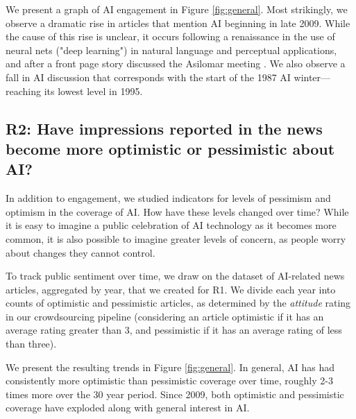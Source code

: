 \documentclass[letterpaper]{article}
\begin{document}
We present a graph of AI engagement in Figure \ref{fig:general}. Most strikingly, we observe a dramatic rise in articles that mention AI beginning in late 2009.  While the cause of this rise is unclear, it occurs following a renaissance in the use of neural nets ("deep learning") in natural language and perceptual applications, and after a front page story discussed the Asilomar meeting \cite{asilomar}. We also observe a fall in AI discussion that corresponds with the start of the 1987 AI winter---reaching its lowest level in 1995. %

\subsection{R2: Have impressions reported in the news become more optimistic or pessimistic about AI?}

In addition to engagement, we studied indicators for levels of pessimism and optimism in the coverage of AI. How have these levels changed over time? While it is easy to imagine a public celebration of AI technology as it becomes more common, it is also possible to imagine greater levels of concern, as people worry about changes they cannot control.

To track public sentiment over time, we draw on the dataset of AI-related news articles, aggregated by year, that we created for R1. We divide each year into counts of optimistic and pessimistic articles, as determined by the \textit{attitude} rating in our crowdsourcing pipeline (considering an article optimistic if it has an average rating greater than 3, and pessimistic if it has an average rating of less than three). %

We present the resulting trends in Figure \ref{fig:general}. In general, AI has had consistently more optimistic than pessimistic coverage over time, roughly 2-3 times more over the 30 year period. Since 2009, both optimistic and pessimistic coverage have exploded along with general interest in AI.
\end{document}
